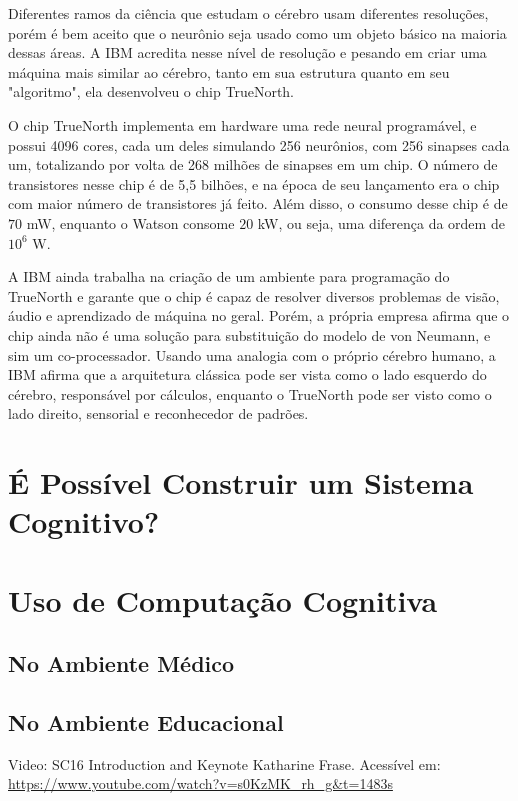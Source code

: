\documentclass[12pt]{article}
\begin{document}
Diferentes ramos da ciência que estudam o cérebro usam diferentes 
resoluções, porém é bem aceito que o neurônio seja usado como um objeto
básico na maioria dessas áreas. A IBM acredita nesse nível de resolução
e pesando em criar uma máquina mais similar ao cérebro, tanto em sua
estrutura quanto em seu "algoritmo", ela desenvolveu o chip TrueNorth.

O chip TrueNorth implementa em hardware uma rede neural programável, e 
possui 4096 cores, cada um deles simulando 256 neurônios, com 256
sinapses cada um, totalizando por volta de 268 milhões de sinapses em
um chip. O número de transistores nesse chip é de 5,5 bilhões, e na 
época de seu lançamento era o chip com maior número de transistores já
feito. Além disso, o consumo desse chip é de $70$ mW, enquanto
o Watson consome $20$ kW, ou seja, uma diferença da ordem de $10 ^ 6$ W.

A IBM ainda trabalha na criação de um ambiente para programação do 
TrueNorth e garante que o chip é capaz de resolver diversos problemas
de visão, áudio e aprendizado de máquina no geral. Porém, a própria
empresa afirma que o chip ainda não é uma solução para substituição do
modelo de von Neumann, e sim um co-processador. Usando uma analogia com
o próprio cérebro humano, a IBM afirma que a arquitetura clássica pode
ser vista como o lado esquerdo do cérebro, responsável por cálculos,
enquanto o TrueNorth pode ser visto como o lado direito, sensorial e
reconhecedor de padrões.

\pagebreak
\section{É Possível Construir um Sistema Cognitivo?}

\pagebreak
\section{Uso de Computação Cognitiva}
\subsection{No Ambiente Médico}
\subsection{No Ambiente Educacional}


\pagebreak
\begin{thebibliography}{1}
 Video: SC16 Introduction and Keynote
    Katharine Frase. Acessível em: 
    \url{https://www.youtube.com/watch?v=s0KzMK_rh_g&t=1483s}
\end{thebibliography}
\end{document}
